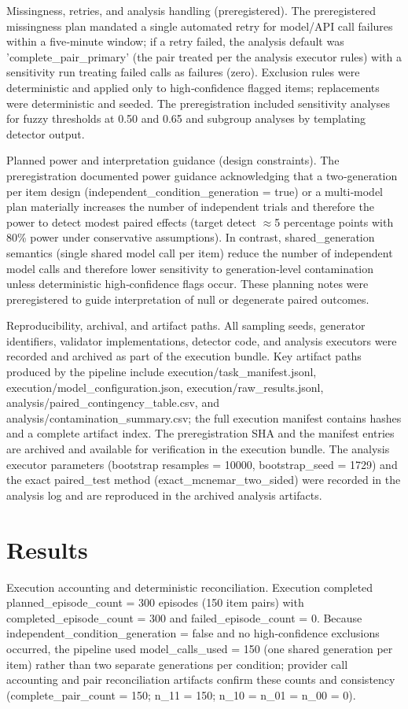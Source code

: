 \documentclass[conference]{IEEEtran}
\begin{document}
Missingness, retries, and analysis handling (preregistered). The preregistered missingness plan mandated a single automated retry for model/API call failures within a five‑minute window; if a retry failed, the analysis default was 'complete\_pair\_primary' (the pair treated per the analysis executor rules) with a sensitivity run treating failed calls as failures (zero). Exclusion rules were deterministic and applied only to high‑confidence flagged items; replacements were deterministic and seeded. The preregistration included sensitivity analyses for fuzzy thresholds at 0.50 and 0.65 and subgroup analyses by templating detector output.

Planned power and interpretation guidance (design constraints). The preregistration documented power guidance acknowledging that a two‑generation per item design (independent\_condition\_generation = true) or a multi‑model plan materially increases the number of independent trials and therefore the power to detect modest paired effects (target detect \ensuremath{\approx}5 percentage points with 80\% power under conservative assumptions). In contrast, shared\_generation semantics (single shared model call per item) reduce the number of independent model calls and therefore lower sensitivity to generation‑level contamination unless deterministic high‑confidence flags occur. These planning notes were preregistered to guide interpretation of null or degenerate paired outcomes.

Reproducibility, archival, and artifact paths. All sampling seeds, generator identifiers, validator implementations, detector code, and analysis executors were recorded and archived as part of the execution bundle. Key artifact paths produced by the pipeline include execution/task\_manifest.jsonl, execution/model\_configuration.json, execution/raw\_results.jsonl, analysis/paired\_contingency\_table.csv, and analysis/contamination\_summary.csv; the full execution manifest contains hashes and a complete artifact index. The preregistration SHA and the manifest entries are archived and available for verification in the execution bundle. The analysis executor parameters (bootstrap resamples = 10000, bootstrap\_seed = 1729) and the exact paired\_test method (exact\_mcnemar\_two\_sided) were recorded in the analysis log and are reproduced in the archived analysis artifacts.

\section{Results}
Execution accounting and deterministic reconciliation. Execution completed planned\_episode\_count = 300 episodes (150 item pairs) with completed\_episode\_count = 300 and failed\_episode\_count = 0. Because independent\_condition\_generation = false and no high‑confidence exclusions occurred, the pipeline used model\_calls\_used = 150 (one shared generation per item) rather than two separate generations per condition; provider call accounting and pair reconciliation artifacts confirm these counts and consistency (complete\_pair\_count = 150; n\_11 = 150; n\_10 = n\_01 = n\_00 = 0).
\end{document}
